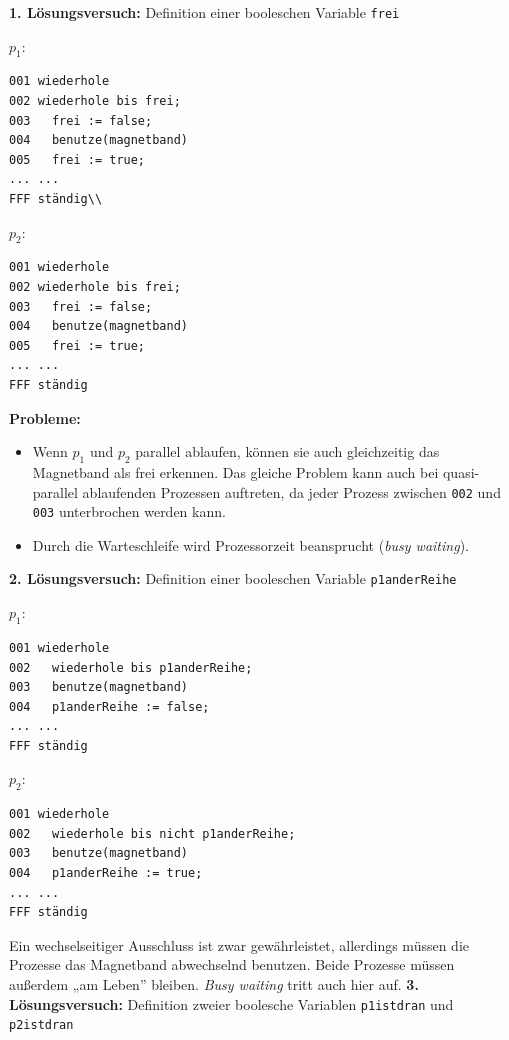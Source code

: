 \documentclass[11pt]{article}
\begin{document}
\textbf{1. Lösungsversuch:} Definition einer booleschen Variable \texttt{frei}\\
\begin{nebeneinander}
\(p_1\):
\begin{verbatim}
001 wiederhole
002 wiederhole bis frei;
003   frei := false;
004   benutze(magnetband)
005   frei := true;
... ...
FFF ständig\\
\end{verbatim}
\end{nebeneinander}
\begin{nebeneinander}
\(p_2\):
\begin{verbatim}
001 wiederhole
002 wiederhole bis frei;
003   frei := false;
004   benutze(magnetband)
005   frei := true;
... ...
FFF ständig
\end{verbatim}
\end{nebeneinander}
\begin{clear}
\end{clear}
\textbf{Probleme:} 
\begin{itemize}
\item Wenn \(p_1\) und \(p_2\) parallel ablaufen, können sie auch gleichzeitig
das Magnetband als frei erkennen. Das gleiche Problem kann auch bei
quasi-parallel ablaufenden Prozessen auftreten, da jeder Prozess
zwischen \texttt{002} und \texttt{003} unterbrochen werden kann.
\item Durch die Warteschleife wird Prozessorzeit beansprucht (\emph{busy
waiting}).
\end{itemize}
\textbf{2. Lösungsversuch:} Definition einer booleschen Variable \texttt{p1anderReihe}\\
\begin{nebeneinander}
\(p_1\):
\begin{verbatim}
001 wiederhole
002   wiederhole bis p1anderReihe;
003   benutze(magnetband)
004   p1anderReihe := false;
... ...
FFF ständig
\end{verbatim}
\end{nebeneinander}
\begin{nebeneinander}
\(p_2\):
\begin{verbatim}
001 wiederhole
002   wiederhole bis nicht p1anderReihe;
003   benutze(magnetband)
004   p1anderReihe := true;
... ...
FFF ständig
\end{verbatim}
\end{nebeneinander}
\begin{clear}
\end{clear}

Ein wechselseitiger Ausschluss ist zwar gewährleistet, allerdings müssen
die Prozesse das Magnetband abwechselnd benutzen. Beide Prozesse müssen
außerdem „am Leben” bleiben. \emph{Busy waiting} tritt auch hier auf.
\textbf{3. Lösungsversuch:} Definition zweier boolesche Variablen \texttt{p1istdran} und \texttt{p2istdran}
\end{document}
